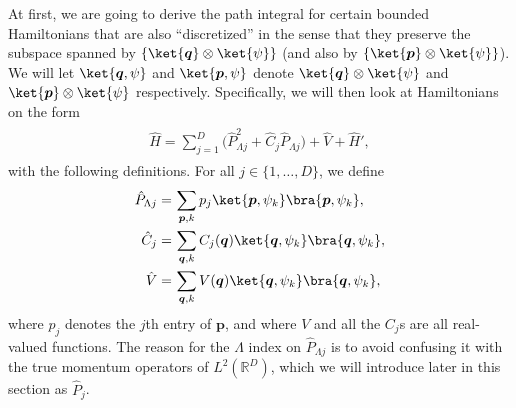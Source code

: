 \documentclass{report}
\begin{document}
At first, we are going to derive the path integral for certain bounded Hamiltonians %
that are also ``discretized'' in the sense that they preserve the subspace spanned by 
$\{\ket{\boldsymbol{q}} \otimes \ket{\psi}\}$ (and also by $\{\ket{\boldsymbol{p}} \otimes \ket{\psi}\}$). We will let $\ket{\boldsymbol{q}, \psi}$ and $\ket{\boldsymbol{p}, \psi}$ denote $\ket{\boldsymbol{q}} \otimes \ket{\psi}$ and $\ket{\boldsymbol{p}} \otimes \ket{\psi}$ respectively. Specifically, we will then look at Hamiltonians on the form
\begin{align}
\begin{aligned}
	\hat H = \sum_{j=1}^{D} 
		\big( \hat P_{\Lambda j}^2 + \hat C_j \hat P_{\Lambda j} \big) + 
		\hat V + \hat H',
\end{aligned}
\end{align} 
with the following definitions. For all $j\in\{1, \ldots, D\}$, we define
\begin{align}
\begin{aligned}
	\hat P_{\Lambda j} =&\, \sum_{\boldsymbol{p}, k} p_j 
		\ket{\boldsymbol{p}, \psi_{k}} \bra{\boldsymbol{p}, \psi_{k}}, \\
	\hat C_{j} =&\, \sum_{\boldsymbol{q}, k} 
		C_j(\boldsymbol{q}) \ket{\boldsymbol{q}, \psi_{k}} \bra{\boldsymbol{q}, \psi_{k}}, \\
	\hat V =&\, \sum_{\boldsymbol{q}, k} 
		V(\boldsymbol{q}) \ket{\boldsymbol{q}, \psi_{k}} \bra{\boldsymbol{q}, \psi_{k}},
\end{aligned}
\end{align} 
where $p_j$ denotes the $j$th entry of $\boldsymbol{p}$, and where $V$ and all the $C_j$s are all real-valued functions.
The reason for the $\Lambda$ index on $\hat P_{\Lambda j}$ is to avoid confusing it with the true momentum operators of $L^2(\mathbb{R}^D)$, which we will introduce later in this section as $\hat P_j$.
\end{document}
